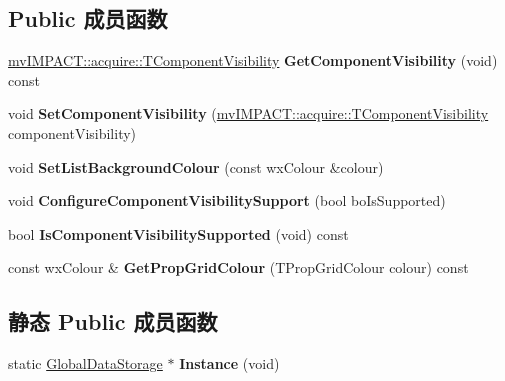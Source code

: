 \subsection*{Public 成员函数}
\begin{DoxyCompactItemize}
\item 
\hypertarget{class_global_data_storage_ac7864f281111c8e62cc4754a9c2fdfae}{\hyperlink{group___common_interface_ga75b333e3ba771df98bde9ee1e12f57a0}{mv\+I\+M\+P\+A\+C\+T\+::acquire\+::\+T\+Component\+Visibility} {\bfseries Get\+Component\+Visibility} (void) const }\label{class_global_data_storage_ac7864f281111c8e62cc4754a9c2fdfae}

\item 
\hypertarget{class_global_data_storage_a60ea3af368cfc67017d3dd341e8fffae}{void {\bfseries Set\+Component\+Visibility} (\hyperlink{group___common_interface_ga75b333e3ba771df98bde9ee1e12f57a0}{mv\+I\+M\+P\+A\+C\+T\+::acquire\+::\+T\+Component\+Visibility} component\+Visibility)}\label{class_global_data_storage_a60ea3af368cfc67017d3dd341e8fffae}

\item 
\hypertarget{class_global_data_storage_a5cdb54f68fc839ee1d732b0f6334eaef}{void {\bfseries Set\+List\+Background\+Colour} (const wx\+Colour \&colour)}\label{class_global_data_storage_a5cdb54f68fc839ee1d732b0f6334eaef}

\item 
\hypertarget{class_global_data_storage_aedec4fddf1b6055c8554fde8d7df8eb5}{void {\bfseries Configure\+Component\+Visibility\+Support} (bool bo\+Is\+Supported)}\label{class_global_data_storage_aedec4fddf1b6055c8554fde8d7df8eb5}

\item 
\hypertarget{class_global_data_storage_a6e013301510af29a2ff7cd69eb6f5d38}{bool {\bfseries Is\+Component\+Visibility\+Supported} (void) const }\label{class_global_data_storage_a6e013301510af29a2ff7cd69eb6f5d38}

\item 
\hypertarget{class_global_data_storage_ad6c9820e70aa295eaf1925bf9713af3f}{const wx\+Colour \& {\bfseries Get\+Prop\+Grid\+Colour} (T\+Prop\+Grid\+Colour colour) const }\label{class_global_data_storage_ad6c9820e70aa295eaf1925bf9713af3f}

\end{DoxyCompactItemize}
\subsection*{静态 Public 成员函数}
\begin{DoxyCompactItemize}
\item 
\hypertarget{class_global_data_storage_aa4c543d1a3cc2439786aa19bc19fb710}{static \hyperlink{class_global_data_storage}{Global\+Data\+Storage} $\ast$ {\bfseries Instance} (void)}\label{class_global_data_storage_aa4c543d1a3cc2439786aa19bc19fb710}

\end{DoxyCompactItemize}



